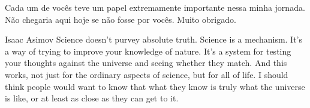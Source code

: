 \documentclass[oneside, bsc]{ufpethesis}
\begin{document}
Cada um de vocês teve um papel extremamente importante nessa minha jornada. Não chegaria aqui hoje se não fosse por vocês. Muito obrigado. 





\begin{epigraph}[1988]{Isaac Asimov}
Science doesn't purvey absolute truth. Science is a mechanism. It's a way of trying to improve your knowledge of nature. It's a system for testing your thoughts against the universe and seeing whether they match. And this works, not just for the ordinary aspects of science, but for all of life. I should think people would want to know that what they know is truly what the universe is like, or at least as close as they can get to it.
\end{epigraph}



\tableofcontents

\listoffigures

\listoftables



\mainmatter







% 
% 
% 



\backmatter

\appendix


% 
% 
% 





\end{document}
